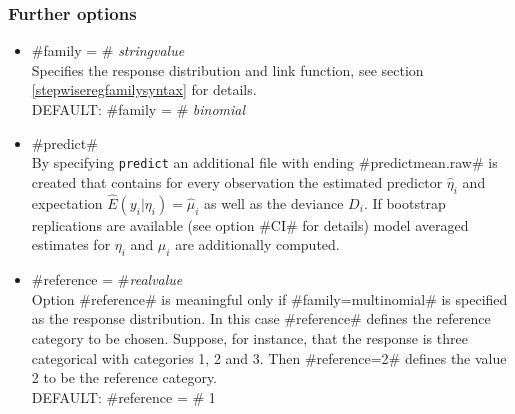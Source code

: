 \subsubsection*{Further options}
\label{stepwisereg_further_options}

\begin{itemize}
\item #family = # {\em stringvalue} \\
 Specifies the response distribution and link function, see section \ref{stepwiseregfamilysyntax} for details. \\
DEFAULT: #family = # {\em binomial}
\item  #predict# \\
By specifying {\tt predict} an
additional file with ending #predictmean.raw# is created that contains for
every observation the estimated predictor $\hat \eta_i$ and
expectation $\hat E(y_i | \eta_i) = \hat \mu_i$ as well as the
deviance $D_i$.  If bootstrap replications are available (see option #CI# for details) model averaged estimates for $\eta_i$ and $\mu_i$
are additionally computed.
\item #reference = #{\em realvalue} \\
Option #reference# is meaningful only if  #family=multinomial# is
specified as the response distribution. In this case #reference#
defines the reference category to be chosen. Suppose, for
instance, that the response is three categorical with categories
1, 2 and 3. Then #reference=2# defines the value 2 to be the reference category. \\
DEFAULT: #reference = # 1
\end{itemize}







